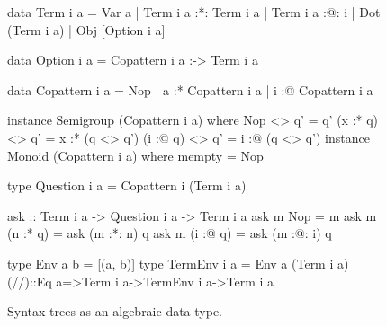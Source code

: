 \documentclass[sigplan,screen]{acmart}
\newcommand{\basicstylesize}{\small}
\begin{document}
\begin{figure}
\centering
\begin{haskell}
data Term i a
  = Var a
  | Term i a :*: Term i a
  | Term i a :@: i
  | Dot (Term i a)
  | Obj [Option i a]

data Option i a = Copattern i a :-> Term i a

data Copattern i a
  = Nop
  | a :* Copattern i a
  | i :@ Copattern i a

instance Semigroup (Copattern i a) where
  Nop      <> q' = q'
  (x :* q) <> q' = x :* (q <> q')
  (i :@ q) <> q' = i :@ (q <> q')
instance Monoid (Copattern i a) where
  mempty = Nop

type Question i a = Copattern i (Term i a)

ask :: Term i a -> Question i a -> Term i a
ask m Nop      = m
ask m (n :* q) = ask (m :*: n) q
ask m (i :@ q) = ask (m :@: i) q

type Env a b = [(a, b)]
type TermEnv i a = Env a (Term i a)
(//)::Eq a=>Term i a->TermEnv i a->Term i a
\end{haskell}
\caption{Syntax trees as an algebraic data type.}
\label{fig:block-syntax-code}
\end{figure}




\end{document}
